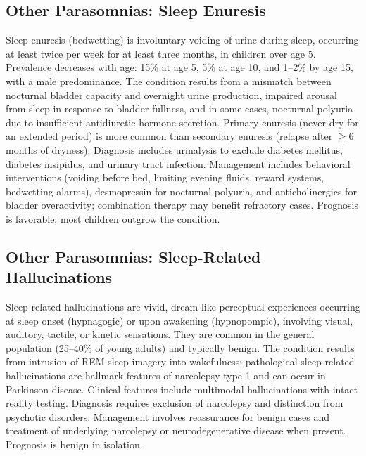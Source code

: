 \subsection{Other Parasomnias: Sleep Enuresis}
\label{sec:Sleep Enuresis}
Sleep enuresis (bedwetting) is involuntary voiding of urine during sleep, occurring at least twice per week for at least three months, in children over age 5. Prevalence decreases with age: 15\% at age 5, 5\% at age 10, and 1--2\% by age 15, with a male predominance. The condition results from a mismatch between nocturnal bladder capacity and overnight urine production, impaired arousal from sleep in response to bladder fullness, and in some cases, nocturnal polyuria due to insufficient antidiuretic hormone secretion. Primary enuresis (never dry for an extended period) is more common than secondary enuresis (relapse after $\ge$6 months of dryness). Diagnosis includes urinalysis to exclude diabetes mellitus, diabetes insipidus, and urinary tract infection. Management includes behavioral interventions (voiding before bed, limiting evening fluids, reward systems, bedwetting alarms), desmopressin for nocturnal polyuria, and anticholinergics for bladder overactivity; combination therapy may benefit refractory cases. Prognosis is favorable; most children outgrow the condition.

\subsection{Other Parasomnias: Sleep-Related Hallucinations}
\label{sec:Sleep-Related Hallucinations}
Sleep-related hallucinations are vivid, dream-like perceptual experiences occurring at sleep onset (hypnagogic) or upon awakening (hypnopompic), involving visual, auditory, tactile, or kinetic sensations. They are common in the general population (25--40\% of young adults) and typically benign. The condition results from intrusion of REM sleep imagery into wakefulness; pathological sleep-related hallucinations are hallmark features of narcolepsy type 1 and can occur in Parkinson disease. Clinical features include multimodal hallucinations with intact reality testing. Diagnosis requires exclusion of narcolepsy and distinction from psychotic disorders. Management involves reassurance for benign cases and treatment of underlying narcolepsy or neurodegenerative disease when present. Prognosis is benign in isolation.

